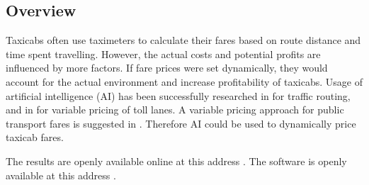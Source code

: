 \subsection{Overview}


Taxicabs often use taximeters to calculate their fares based on route distance
and time spent travelling. However, the actual costs and potential profits are
influenced by more factors. If fare prices were set dynamically, they would
account for the actual environment and increase profitability of taxicabs.
Usage of artificial intelligence (AI) has been successfully researched in
\textcite{Tavares2012ai+routing} for traffic routing, and in
\textcite{Lou2011ai+highways} for variable pricing of toll lanes. A variable
pricing approach for public transport fares is suggested in
\textcite{Emele2013pricing+rural}. Therefore AI could be used to dynamically
price taxicab fares.

The results are openly available online at this address .
The software is openly available at this address .
